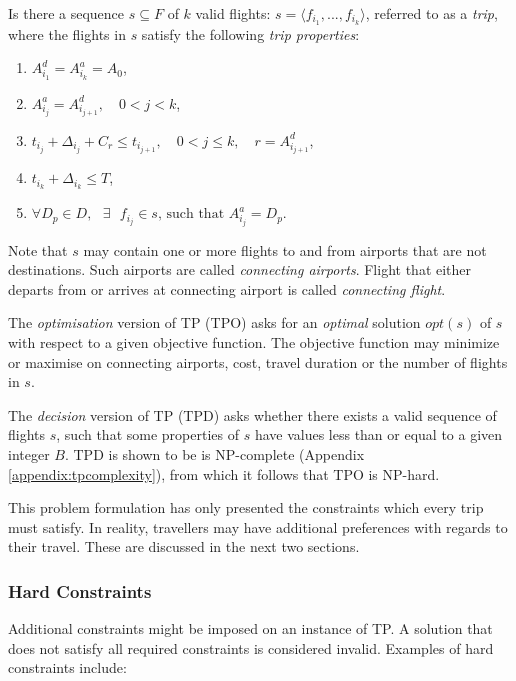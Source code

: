 \documentclass{mpaper}
\begin{document}
\begin{question}
Is there a sequence $s \subseteq F$ of $k$ valid flights: $s = \langle f_{i_{1}},...,f_{i_{k}} \rangle $, referred to as a \textit{trip}, where the flights in $s$ satisfy the following \textit{trip properties}:

\begin{enumerate}[topsep=0.3em]
\setlength\itemsep{0.3em}
\item $A^{d}_{i_{1}} = A^{a}_{i_{k}} = A_{0}$,
\item $ A^{a}_{i_{j}} = A^{d}_{i_{j+1}},  \quad 0 < j < k$,
\item $ t_{i_{j}} + \Delta_{i_{j}} + C_{r} \leq t_{i_{j+1}}, \quad 0 < j \leq k, \quad r = A^{d}_{i_{j+1}}$,
\item $t_{i_{k}} + \Delta_{i_{k}} \leq T$,
\item $ \forall D_{p} \in D, \textrm{ } \exists \textrm{ } f_{i_{j}} \in s \textrm{, such that } A^{a}_{i_{j}} = D_{p}$.
\end{enumerate}
Note that $s$ may contain one or more flights to and from airports that are not destinations. Such airports are called \textit{connecting airports}. Flight that either departs from or arrives at connecting airport is called \textit{connecting flight}.
\end{question}
The \textit{optimisation} version of TP (TPO) asks for an \textit{optimal} solution $opt(s)$ of $s$ with respect to a given objective function. The objective function may minimize or maximise on connecting airports, cost, travel duration or the number of flights in $s$.

The \textit{decision} version of TP (TPD) asks whether there exists a valid sequence of flights $s$, such that some properties of $s$ have values less than or equal to a given integer $B$. TPD is shown to be is NP-complete (Appendix \ref{appendix:tpcomplexity}), from which it follows that TPO is NP-hard.

This problem formulation has only presented the constraints which every trip must satisfy. In reality, travellers may have additional preferences with regards to their travel. These are discussed in the next two sections.

\subsubsection*{Hard Constraints}
\label{subsec:hardconstraints}
Additional constraints might be imposed on an instance of TP. A solution that does not satisfy all required constraints is considered invalid. Examples of hard constraints include:
\end{document}

